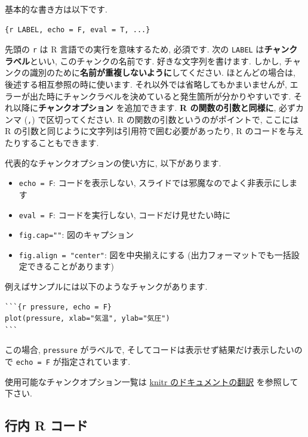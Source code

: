 \documentclass[
]{ltjsarticle}
\providecommand{\tightlist}{%
  \setlength{\itemsep}{0pt}\setlength{\parskip}{0pt}}
\begin{document}
基本的な書き方は以下です.

\begin{verbatim}
{r LABEL, echo = F, eval = T, ...}
\end{verbatim}

先頭の \texttt{r} は R 言語での実行を意味するため, 必須です. 次の \texttt{LABEL} は\textbf{チャンクラベル}といい, このチャンクの名前です. 好きな文字列を書けます. しかし, チャンクの識別のために\textbf{名前が重複しないように}してください. ほとんどの場合は, 後述する相互参照の時に使います. それ以外では省略してもかまいませんが, エラーが出た時にチャンクラベルを決めていると発生箇所が分かりやすいです. それ以降に\textbf{チャンクオプション} を追加できます. \textbf{R の関数の引数と同様に}, 必ずカンマ (\texttt{,}) で区切ってください. R の関数の引数というのがポイントで, ここには R の引数と同じように文字列は引用符で囲む必要があったり, R のコードを与えたりすることもできます.

代表的なチャンクオプションの使い方に, 以下があります.

\begin{itemize}
\tightlist
\item
  \texttt{echo\ =\ F}: コードを表示しない, スライドでは邪魔なのでよく非表示にします
\item
  \texttt{eval\ =\ F}: コードを実行しない, コードだけ見せたい時に
\item
  \texttt{fig.cap=""}: 図のキャプション
\item
  \texttt{fig.align\ =\ "center"}: 図を中央揃えにする (出力フォーマットでも一括設定できることがあります)
\end{itemize}

例えばサンプルには以下のようなチャンクがあります.

\begin{verbatim}
```{r pressure, echo = F}
plot(pressure, xlab="気温", ylab="気圧")
```
\end{verbatim}

この場合, \texttt{pressure} がラベルで, そしてコードは表示せず結果だけ表示したいので \texttt{echo\ =\ F} が指定されています.

使用可能なチャンクオプション一覧は \href{https://gedevan-aleksizde.github.io/knitr-doc-ja/index.html}{knitr のドキュメントの翻訳} を参照して下さい.

\hypertarget{ux884cux5185-r-ux30b3ux30fcux30c9}{%
\subsection{行内 R コード}\label{ux884cux5185-r-ux30b3ux30fcux30c9}}
\end{document}
